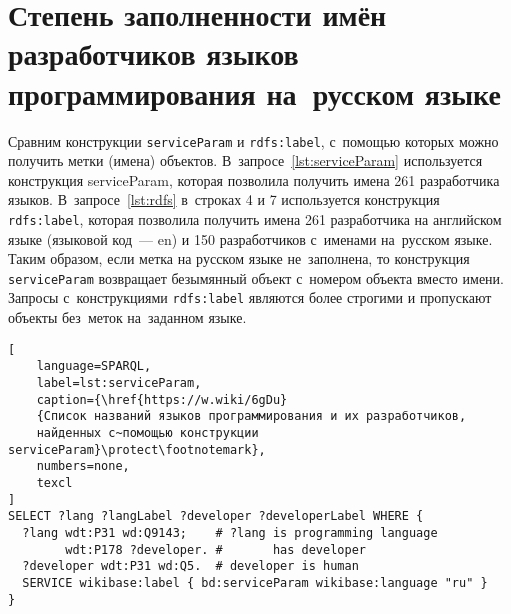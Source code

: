 


\section{Степень заполненности имён разработчиков языков программирования на~русском языке}


Сравним конструкции \texttt{serviceParam} и \texttt{rdfs:label}, 
с~помощью которых можно получить метки (имена) объектов. 
%
В~запросе~\ref{lst:serviceParam} используется конструкция serviceParam, 
которая позволила получить имена 261 разработчика языков. 
%
В~запросе~\ref{lst:rdfs} в~строках 4 и 7 используется конструкция \texttt{rdfs:label}, 
которая позволила получить имена 261 разработчика на английском языке (языковой код~--- en) 
и 150 разработчиков с~именами на~русском языке. 
%
Таким образом, если метка на русском языке не~заполнена, 
то конструкция \texttt{serviceParam} возвращает безымянный объект с~номером объекта вместо имени. 
Запросы с~конструкциями \texttt{rdfs:label} являются более строгими и пропускают 
объекты без~меток на~заданном языке. 


\begin{lstlisting}[
	language=SPARQL,
	label=lst:serviceParam,
	caption={\href{https://w.wiki/6gDu}
    {Список названий языков программирования и их разработчиков, 
    найденных с~помощью конструкции serviceParam}\protect\footnotemark},
    numbers=none,
	texcl
]
SELECT ?lang ?langLabel ?developer ?developerLabel WHERE {
  ?lang wdt:P31 wd:Q9143;    # ?lang is programming language
        wdt:P178 ?developer. #       has developer 
  ?developer wdt:P31 wd:Q5.  # developer is human
  SERVICE wikibase:label { bd:serviceParam wikibase:language "ru" }
}
\end{lstlisting}

